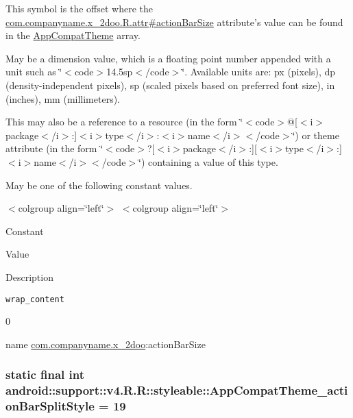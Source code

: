 This symbol is the offset where the \hyperlink{classcom_1_1companyname_1_1x__2doo_1_1_r_1_1attr_c1625acac5fe34a8dac7bf00850eea71}{com.companyname.x\_\-2doo.R.attr\#actionBarSize} attribute's value can be found in the \hyperlink{classandroid_1_1support_1_1v4_1_1_r_1_1styleable_0873e92ba21076bb5a4aeadeb7f5779f}{AppCompatTheme} array.

May be a dimension value, which is a floating point number appended with a unit such as \char`\"{}$<$code$>$14.5sp$<$/code$>$\char`\"{}. Available units are: px (pixels), dp (density-independent pixels), sp (scaled pixels based on preferred font size), in (inches), mm (millimeters). 

This may also be a reference to a resource (in the form \char`\"{}$<$code$>$@\mbox{[}$<$i$>$package$<$/i$>$:\mbox{]}$<$i$>$type$<$/i$>$:$<$i$>$name$<$/i$>$$<$/code$>$\char`\"{}) or theme attribute (in the form \char`\"{}$<$code$>$?\mbox{[}$<$i$>$package$<$/i$>$:\mbox{]}\mbox{[}$<$i$>$type$<$/i$>$:\mbox{]}$<$i$>$name$<$/i$>$$<$/code$>$\char`\"{}) containing a value of this type. 

May be one of the following constant values. \begin{TabularC}{0}
\hline
\end{TabularC}
$<$colgroup align=\char`\"{}left\char`\"{}$>$ $<$colgroup align=\char`\"{}left\char`\"{}$>$ 

Constant

Value

Description 

{\tt wrap\_\-content}

0

name \hyperlink{namespacecom_1_1companyname_1_1x__2doo}{com.companyname.x\_\-2doo}:actionBarSize \hypertarget{classandroid_1_1support_1_1v4_1_1_r_1_1styleable_45e5a64b1e5eae0d6bd7742eb43a7c56}{
\subsubsection[{AppCompatTheme\_\-actionBarSplitStyle}]{\setlength{\rightskip}{0pt plus 5cm}static final int android::support::v4.R.R::styleable::AppCompatTheme\_\-actionBarSplitStyle = 19}}
\label{classandroid_1_1support_1_1v4_1_1_r_1_1styleable_45e5a64b1e5eae0d6bd7742eb43a7c56}


